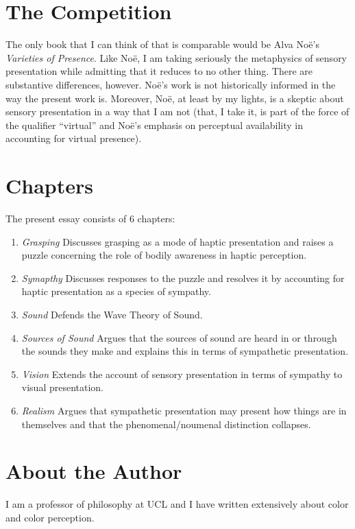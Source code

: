 \documentclass[12pt]{article}
\begin{document}

\section{The Competition} %
\label{sec:the_competition}

The only book that I can think of that is comparable would be Alva No\"{e}'s \emph{Varieties of Presence}. Like No\"{e}, I am taking seriously the metaphysics of sensory presentation while admitting that it reduces to no other thing. There are substantive differences, however. No\"{e}'s work is not historically informed in the way the present work is. Moreover, No\"{e}, at least by my lights, is a skeptic about sensory presentation in a way that I am not (that, I take it, is part of the force of the qualifier ``virtual'' and No\"{e}'s emphasis on perceptual availability in accounting for virtual presence).


\section{Chapters} %
\label{sec:chapters}

The present essay consists of 6 chapters:

\begin{enumerate}
	\item \emph{Grasping} Discusses grasping as a mode of haptic presentation and raises a puzzle concerning the role of bodily awareness in haptic perception.
	\item \emph{Symapthy} Discusses responses to the puzzle and resolves it by accounting for haptic presentation as a species of sympathy.
	\item \emph{Sound} Defends the Wave Theory of Sound.
	\item \emph{Sources of Sound} Argues that the sources of sound are heard in or through the sounds they make and explains this in terms of sympathetic presentation.
	\item \emph{Vision} Extends the account of sensory presentation in terms of sympathy to visual presentation.
	\item \emph{Realism} Argues that sympathetic presentation may present how things are in themselves and that the phenomenal/noumenal distinction collapses.
\end{enumerate}


\section{About the Author} %
\label{sec:about_the_author}

I am a professor of philosophy at UCL and I have written extensively about color and color perception.

\end{document}
